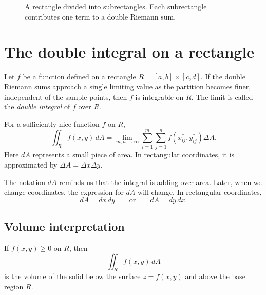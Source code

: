 \documentclass[11pt]{article}
\newcommand{\dA}{\,dA}
\begin{document}
\begin{figure}[H]
\centering
{}
\caption{A rectangle divided into subrectangles. Each subrectangle contributes one term to a double Riemann sum.}
\end{figure}

\section{The double integral on a rectangle}

Let $f$ be a function defined on a rectangle $R=[a,b]\times[c,d]$. If the double Riemann sums approach a single limiting value as the partition becomes finer, independent of the sample points, then $f$ is integrable on $R$. The limit is called the \emph{double integral} of $f$ over $R$.

\begin{importantbox}
For a sufficiently nice function $f$ on $R$,
\[
\iint_R f(x,y)\dA=\lim_{m,n\to\infty}\sum_{i=1}^m\sum_{j=1}^n f(x_{ij}^*,y_{ij}^*)\Delta A.
\]
Here $dA$ represents a small piece of area. In rectangular coordinates, it is approximated by $\Delta A=\Delta x\Delta y$.
\end{importantbox}

The notation $dA$ reminds us that the integral is adding over area. Later, when we change coordinates, the expression for $dA$ will change. In rectangular coordinates,
\[
dA=dx\,dy\qquad \text{or}\qquad dA=dy\,dx.
\]

\subsection*{Volume interpretation}
If $f(x,y)\ge 0$ on $R$, then
\[
\iint_R f(x,y)\dA
\]
is the volume of the solid below the surface $z=f(x,y)$ and above the base region $R$.
\end{document}
